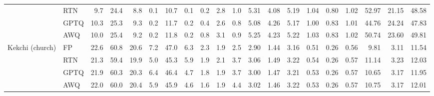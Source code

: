 \begin{landscape}
\begin{longtable}{llrrrrrrrrrrrrrrrrrr}
 & RTN & 9.7 & \cellcolor{loss!18}24.4 & \cellcolor{loss!9}8.8 & \cellcolor{loss!0}0.1 & \cellcolor{loss!9}10.7 & \cellcolor{loss!0}0.1 & 0.2 & 2.8 & 1.0 & \cellcolor{loss!18}5.31 & 4.08 & 5.19 & \cellcolor{loss!20}1.04 & 0.80 & 1.02 & \cellcolor{loss!60}52.97 & 21.15 & 48.58 \\
 & GPTQ & 10.3 & \cellcolor{loss!6}25.3 & \cellcolor{loss!2}9.3 & 0.2 & \cellcolor{loss!3}11.7 & \cellcolor{loss!0}0.2 & 0.4 & 2.6 & 0.8 & \cellcolor{loss!2}5.08 & \cellcolor{loss!6}4.26 & 5.17 & \cellcolor{loss!2}1.00 & \cellcolor{loss!6}0.83 & 1.01 & \cellcolor{loss!5}44.76 & \cellcolor{loss!10}24.24 & 47.83 \\
 & AWQ & 10.0 & \cellcolor{loss!5}25.4 & \cellcolor{loss!2}9.2 & 0.2 & \cellcolor{loss!2}11.8 & \cellcolor{loss!0}0.2 & 0.8 & 3.1 & 0.9 & \cellcolor{loss!13}5.25 & \cellcolor{loss!4}4.23 & \cellcolor{loss!1}5.22 & \cellcolor{loss!14}1.03 & \cellcolor{loss!3}0.83 & \cellcolor{loss!2}1.02 & \cellcolor{loss!45}50.74 & \cellcolor{loss!6}23.60 & \cellcolor{loss!4}49.81 \\
\midrule
Kekchi (church) & FP & 22.6 & 60.8 & 20.6 & 7.2 & 47.0 & 6.3 & 2.3 & 1.9 & 2.5 & 2.90 & 1.44 & 3.16 & 0.51 & 0.26 & 0.56 & 9.81 & 3.11 & 11.54 \\
 & RTN & \cellcolor{loss!18}21.3 & \cellcolor{loss!19}59.4 & \cellcolor{loss!9}19.9 & \cellcolor{loss!16}5.0 & \cellcolor{loss!12}45.3 & \cellcolor{loss!3}5.9 & 1.9 & \cellcolor{loss!4}2.1 & \cellcolor{loss!23}3.7 & \cellcolor{loss!11}3.06 & \cellcolor{loss!4}1.49 & \cellcolor{loss!4}3.22 & \cellcolor{loss!12}0.54 & 0.26 & \cellcolor{loss!4}0.57 & \cellcolor{loss!9}11.14 & \cellcolor{loss!1}3.23 & \cellcolor{loss!3}12.03 \\
 & GPTQ & \cellcolor{loss!9}21.9 & \cellcolor{loss!7}60.3 & \cellcolor{loss!4}20.3 & \cellcolor{loss!5}6.4 & \cellcolor{loss!4}46.4 & \cellcolor{loss!12}4.7 & 1.8 & 1.9 & \cellcolor{loss!23}3.7 & \cellcolor{loss!7}3.00 & \cellcolor{loss!2}1.47 & \cellcolor{loss!3}3.21 & \cellcolor{loss!10}0.53 & 0.26 & \cellcolor{loss!4}0.57 & \cellcolor{loss!6}10.65 & \cellcolor{loss!0}3.17 & \cellcolor{loss!3}11.95 \\
 & AWQ & \cellcolor{loss!8}22.0 & \cellcolor{loss!11}60.0 & \cellcolor{loss!3}20.4 & \cellcolor{loss!9}5.9 & \cellcolor{loss!8}45.9 & \cellcolor{loss!12}4.6 & 1.6 & \cellcolor{loss!0}1.9 & \cellcolor{loss!37}4.4 & \cellcolor{loss!8}3.02 & \cellcolor{loss!2}1.46 & \cellcolor{loss!4}3.22 & \cellcolor{loss!10}0.53 & 0.26 & \cellcolor{loss!4}0.57 & \cellcolor{loss!6}10.75 & \cellcolor{loss!0}3.17 & \cellcolor{loss!3}12.01 \\

\end{longtable}
\end{landscape}
